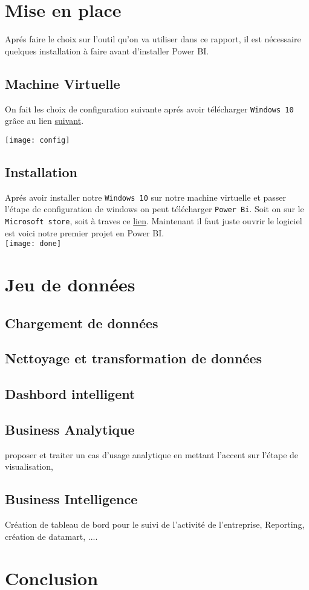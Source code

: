 \documentclass[french,a4paper,11pt,oneside]{book}
\begin{document}
	\section{Mise en place}{
		Aprés faire le choix sur l'outil qu'on va utiliser dans ce rapport, il est nécessaire quelques installation à faire avant d'installer Power BI.\\
			\subsection{Machine Virtuelle}{
				On fait les choix de configuration suivante aprés avoir télécharger \texttt {Windows 10} grâce au lien \href{https://www.microsoft.com/fr-fr/software-download/windows10ISO}{suivant}.
				
				\texttt{[image: config]}
			}
			\subsection{Installation}{
				Aprés avoir installer notre \texttt{Windows 10} sur notre machine virtuelle et passer l'étape de configuration de windows on peut télécharger \texttt{Power Bi}.
				Soit on sur le \texttt{Microsoft store}, soit à traves ce \href{https://www.microsoft.com/fr-fr/download/details.aspx?id=58494}{lien}.
				Maintenant il faut juste ouvrir le logiciel est voici notre premier projet en Power BI.\\
				\texttt{[image: done]}
			}
	}

	\section{Jeu de données}{
		
		\subsection{Chargement de données}{
		}
		\subsection{Nettoyage et transformation de données}{
		}
	
		\subsection{Dashbord intelligent}{
		
		}

		\subsection{Business Analytique}{
			proposer et traiter un cas d’usage analytique en mettant l’accent sur l’étape de visualisation,
		
		}
	
		\subsection{Business Intelligence}{
			Création de tableau de bord pour le suivi de l’activité de l’entreprise, Reporting, création de datamart, ....
		
		}
		

	}
	
	\section{Conclusion}{
	
	}


	
	
\end{document}
